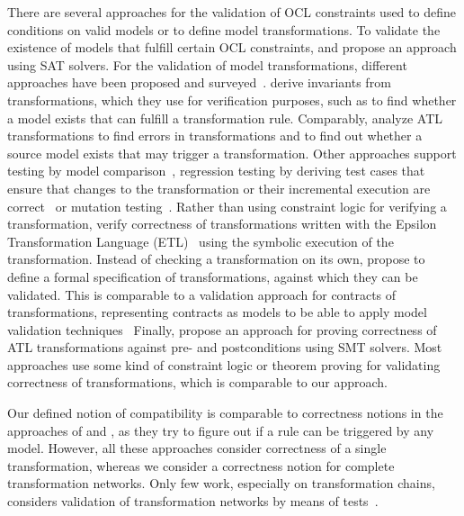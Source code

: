 There are several approaches for the validation of OCL constraints used to define conditions on valid models or to define model transformations.
To validate the existence of models that fulfill certain OCL constraints, %
\textcite{kuhlmann2011a} and \textcite{gonzalez2012a} propose an approach using SAT solvers.
For the validation of model transformations, different approaches have been proposed and surveyed~\cite{calegari2013verificationTransformations-ENTCS,rahim2015SurveyTransformationVerification-SoSym}.
\textcite{cabot2010VerificationInvariants-JSS} derive invariants from transformations, which they use for verification purposes, such as to find whether a model exists that can fulfill a transformation rule.
Comparably, \textcite{cuadrado2017tse} analyze ATL transformations to find errors in transformations and to find out whether a source model exists that may trigger a transformation.
Other approaches support testing by model comparison~\cite{kolovos2006transformationTesting-WGIMM}, regression testing by deriving test cases that ensure that changes to the transformation or their incremental execution are correct~\cite{troy2018inferenceTransformations-JSS} or mutation testing~\cite{troya2015imutationTestingTransformations-ICSTW}.
Rather than using constraint logic for verifying a transformation, \textcite{azizi2017ContractVerification-ICCKE} verify correctness of transformations written with the Epsilon Transformation Language (ETL)~\cite{kolovos2014epsilon-Book} using the symbolic execution of the transformation.
Instead of checking a transformation on its own, \textcite{vallecillo2012FormalTesting-FMMDE} propose to define a formal specification of transformations, against which they can be validated.
This is comparable to a validation approach for contracts of transformations, representing contracts as models to be able to apply model validation techniques~\cite{braga2014consistencyTransformations-SCP}
Finally, \textcite{buettner2012models} propose an approach for proving correctness of \gls{ATL} transformations against pre- and postconditions using \gls{SMT} solvers.
Most approaches use some kind of constraint logic or theorem proving for validating correctness of transformations, which is comparable to our approach.

Our defined notion of compatibility is comparable to correctness notions in the approaches of \textcite{cuadrado2017tse} and \textcite{cabot2010VerificationInvariants-JSS}, as they try to figure out if a rule can be triggered by any model.
However, all these approaches consider correctness of a single transformation, whereas we consider a correctness notion for complete transformation networks.
Only few work, especially on transformation chains, considers validation of transformation networks by means of tests~\cite{bauer2011combiningCoverageChains-ICMT}.



